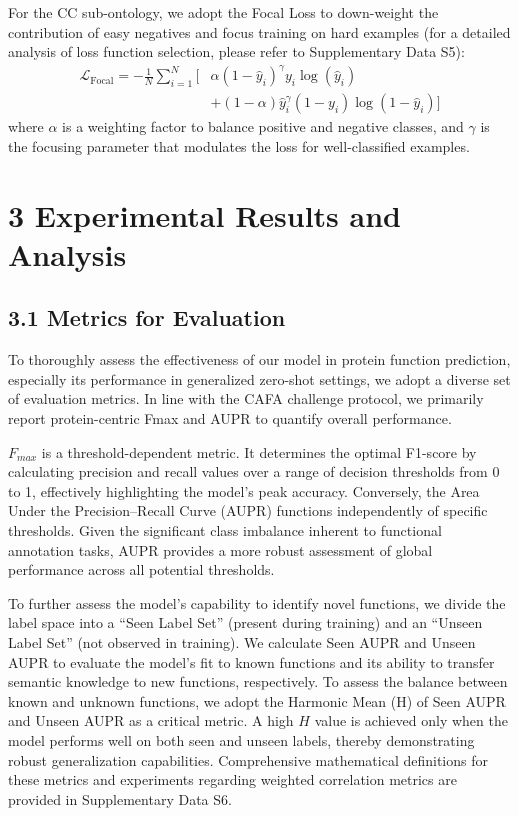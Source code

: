 \documentclass[unnumsec,webpdf,contemporary,large]{oup-authoring-template}%
\theoremstyle{thmstyleone}%
\theoremstyle{thmstyletwo}%
\theoremstyle{thmstylethree}%
\begin{document}
For the CC sub-ontology, we adopt the Focal Loss to down-weight the contribution of easy negatives and focus training on hard examples (for a detailed analysis of loss function selection, please refer to Supplementary Data S5):
\begin{equation}
\begin{split}
    \mathcal{L}_{\text{Focal}} = -\frac{1}{N} \sum_{i=1}^{N} \Big[ & \alpha (1 - \hat{y}_i)^\gamma y_i \log(\hat{y}_i) \\
    & + (1 - \alpha) \hat{y}_i^\gamma (1 - y_i) \log(1 - \hat{y}_i) \Big]
\end{split}
\end{equation}
where $\alpha$ is a weighting factor to balance positive and negative classes, and $\gamma$ is the focusing parameter that modulates the loss for well-classified examples.

\section{3 Experimental Results and Analysis}

\subsection{3.1 Metrics for Evaluation}
To thoroughly assess the effectiveness of our model in protein function prediction, especially its performance in generalized zero-shot settings, we adopt a diverse set of evaluation metrics. In line with the CAFA challenge protocol\citep{zhou2019cafa}, we primarily report protein-centric Fmax and AUPR to quantify overall performance.

$F_{max}$ is a threshold-dependent metric. It determines the optimal F1-score by calculating precision and recall values over a range of decision thresholds from 0 to 1, effectively highlighting the model's peak accuracy. Conversely, the Area Under the Precision–Recall Curve (AUPR) functions independently of specific thresholds. Given the significant class imbalance inherent to functional annotation tasks, AUPR provides a more robust assessment of global performance across all potential thresholds.

To further assess the model’s capability to identify novel functions, we divide the label space into a “Seen Label Set” (present during training) and an “Unseen Label Set” (not observed in training). We calculate Seen AUPR and Unseen AUPR to evaluate the model's fit to known functions and its ability to transfer semantic knowledge to new functions, respectively. To assess the balance between known and unknown functions, we adopt the Harmonic Mean (H) of Seen AUPR and Unseen AUPR as a critical metric. A high $H$ value is achieved only when the model performs well on both seen and unseen labels, thereby demonstrating robust generalization capabilities. Comprehensive mathematical definitions for these metrics and experiments regarding weighted correlation metrics are provided in Supplementary Data S6.
\end{document}
